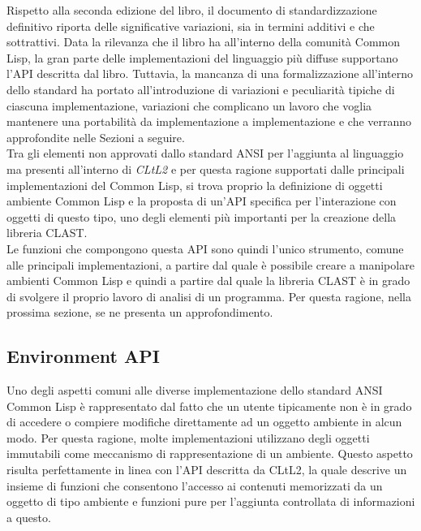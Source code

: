 Rispetto alla seconda edizione del libro, il documento di standardizzazione
definitivo riporta delle significative variazioni, sia in termini additivi e che
sottrattivi. Data la rilevanza che il libro ha all’interno della comunità Common
Lisp, la gran parte delle implementazioni del linguaggio più diffuse supportano
l’API descritta dal libro. Tuttavia, la mancanza di una formalizzazione
all’interno dello standard ha portato all’introduzione di variazioni e
peculiarità tipiche di ciascuna implementazione, variazioni che complicano un
lavoro che voglia mantenere una portabilità da implementazione a implementazione
e che verranno approfondite nelle Sezioni a seguire.\\

Tra gli elementi non approvati dallo standard ANSI per l’aggiunta al linguaggio
ma presenti all’interno di \textit{CLtL2} e per questa ragione supportati dalle
principali implementazioni del Common Lisp, si trova proprio la definizione di
oggetti ambiente Common Lisp e la proposta di un'API specifica per l’interazione
con  oggetti di questo tipo, uno degli elementi più importanti per la creazione
della libreria CLAST.\\

Le funzioni che compongono questa API sono quindi l'unico strumento, comune alle
principali implementazioni, a partire dal quale è possibile creare a manipolare
ambienti Common Lisp e quindi a partire dal quale la libreria CLAST è in grado
di svolgere il proprio lavoro di analisi di un programma. Per questa ragione,
nella prossima sezione, se ne presenta un approfondimento.

\subsection{Environment API}

Uno degli aspetti comuni alle diverse implementazione dello standard ANSI Common
Lisp è rappresentato dal fatto che un utente tipicamente non è in grado di
accedere o compiere modifiche direttamente ad un oggetto ambiente in alcun modo.
Per questa ragione, molte implementazioni utilizzano degli oggetti immutabili
come meccanismo di rappresentazione di un ambiente. Questo aspetto risulta
perfettamente in linea con l’API descritta da CLtL2, la quale descrive un
insieme di funzioni che consentono l’accesso ai contenuti memorizzati da un
oggetto di tipo ambiente e funzioni pure per l’aggiunta controllata di
informazioni a questo.\\

